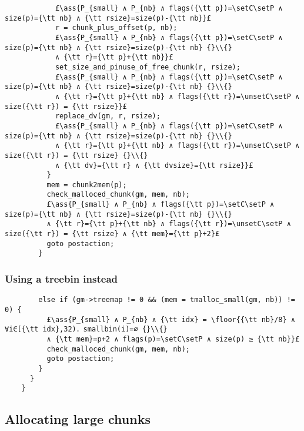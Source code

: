 \documentclass[10pt,a4paper,twoside]{report}
\makeatletter
\newcommand{\ml}[2][t]{\mbox{\mdseries\begin{tabular}[#1]{@{}L@{}}#2\end{tabular}}}
\newcommand{\ass}[1]{\ensuremath{{\color{blue}\left\{\ml[c]{#1}\right\}}}}
\renewcommand{\floor}[2][]{\left\lfloor{#2}\right\rfloor_{#1}}
\newcommand{\setC}{\raisebox{1.5pt}{$\blacktriangledown$}}
\newcommand{\unsetC}{\raisebox{1.5pt}{$\triangledown$}}
\newcommand{\setP}{{\blacktriangle}}
\makeatother
\begin{document}
\begin{lstlisting}
            £\ass{P_{small} ∧ P_{nb} ∧ flags({\tt p})=\setC\setP ∧ size(p)={\tt nb} ∧ {\tt rsize}=size(p)-{\tt nb}}£
            r = chunk_plus_offset(p, nb);
            £\ass{P_{small} ∧ P_{nb} ∧ flags({\tt p})=\setC\setP ∧ size(p)={\tt nb} ∧ {\tt rsize}=size(p)-{\tt nb} {}\\{}
            ∧ {\tt r}={\tt p}+{\tt nb}}£
            set_size_and_pinuse_of_free_chunk(r, rsize);
            £\ass{P_{small} ∧ P_{nb} ∧ flags({\tt p})=\setC\setP ∧ size(p)={\tt nb} ∧ {\tt rsize}=size(p)-{\tt nb} {}\\{} 
            ∧ {\tt r}={\tt p}+{\tt nb} ∧ flags({\tt r})=\unsetC\setP ∧ size({\tt r}) = {\tt rsize}}£
            replace_dv(gm, r, rsize);
            £\ass{P_{small} ∧ P_{nb} ∧ flags({\tt p})=\setC\setP ∧ size(p)={\tt nb} ∧ {\tt rsize}=size(p)-{\tt nb} {}\\{} 
            ∧ {\tt r}={\tt p}+{\tt nb} ∧ flags({\tt r})=\unsetC\setP ∧ size({\tt r}) = {\tt rsize} {}\\{}
            ∧ {\tt dv}={\tt r} ∧ {\tt dvsize}={\tt rsize}}£
          }
          mem = chunk2mem(p);
          check_malloced_chunk(gm, mem, nb);
          £\ass{P_{small} ∧ P_{nb} ∧ flags({\tt p})=\setC\setP ∧ size(p)={\tt nb} ∧ {\tt rsize}=size(p)-{\tt nb} {}\\{} 
          ∧ {\tt r}={\tt p}+{\tt nb} ∧ flags({\tt r})=\unsetC\setP ∧ size({\tt r}) = {\tt rsize} ∧ {\tt mem}={\tt p}+2}£
          goto postaction;
        }
\end{lstlisting}

\subsubsection*{Using a treebin instead}\label{sect:using_a_treebin_instead}

\begin{lstlisting}
        else if (gm->treemap != 0 && (mem = tmalloc_small(gm, nb)) != 0) {
          £\ass{P_{small} ∧ P_{nb} ∧ {\tt idx} = \floor{{\tt nb}/8} ∧ ∀i∈[{\tt idx},32)．smallbin(i)=∅ {}\\{}
          ∧ {\tt mem}=p+2 ∧ flags(p)=\setC\setP ∧ size(p) ≥ {\tt nb}}£
          check_malloced_chunk(gm, mem, nb);
          goto postaction;
        }
      }
    }
\end{lstlisting}

\subsection*{Allocating large chunks}\label{sect:allocating_large_chunks}
\end{document}
